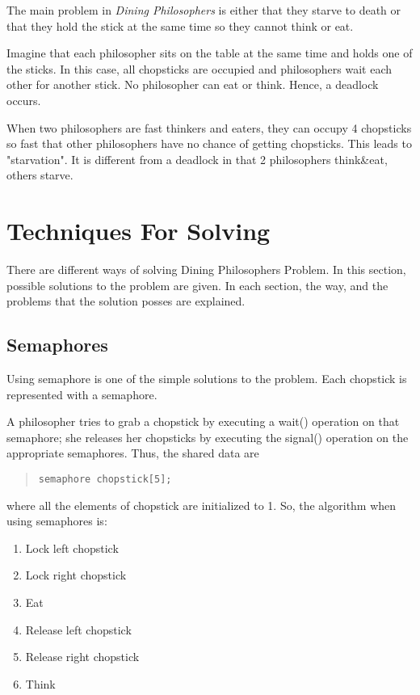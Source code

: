 \documentclass[a4paper,12pt]{article}
\begin{document}
The main problem in \emph{Dining Philosophers} is either that they starve to
death or that they hold the stick at the same time so they cannot think
or eat.

Imagine that each philosopher sits on the table at the same time and
holds one of the sticks. In this case, all chopsticks are occupied and
philosophers wait each other for another stick. No philosopher can eat
or think. Hence, a deadlock occurs.

When two philosophers are fast thinkers and eaters, they can occupy 4
chopsticks so fast that other philosophers have no chance of getting
chopsticks. This leads to "starvation". It is different from a deadlock
in that 2 philosophers think\&eat, others starve.


\section{Techniques For Solving} %
\label{sec:Techniques For Solving}

There are different ways of solving Dining Philosophers Problem. In this
section, possible solutions to the problem are given. In each section,
the way, and the problems that the solution posses are explained.

\subsection{Semaphores} %
\label{sub:Semaphores}

Using semaphore is one of the simple solutions to the problem. Each
chopstick is represented with a semaphore. 

A philosopher tries to grab a chopstick by executing a wait() operation
on that semaphore; she releases her chopsticks by executing the signal()
operation on the appropriate semaphores. Thus, the shared data are

\begin{quote}
\begin{verbatim}
semaphore chopstick[5];
\end{verbatim}
\end{quote}

where all the elements of chopstick are initialized to 1. So, the
algorithm when using semaphores is:

\begin{enumerate}
    \item Lock left chopstick
    \item Lock right chopstick
    \item Eat
    \item Release left chopstick
    \item Release right chopstick
    \item Think
\end{enumerate}
\end{document}
